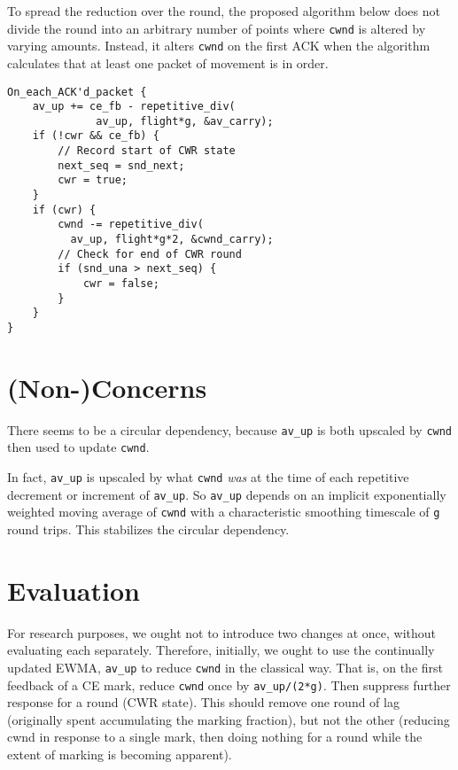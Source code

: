 To spread the reduction over the round, the proposed algorithm below does not divide the round into an arbitrary number of points where \texttt{cwnd} is altered by varying amounts. Instead, it alters \texttt{cwnd} on the first ACK when the algorithm calculates that at least one packet of movement is in order. 


\begin{verbatim}
On_each_ACK'd_packet {
    av_up += ce_fb - repetitive_div(
              av_up, flight*g, &av_carry);
    if (!cwr && ce_fb) {
        // Record start of CWR state
        next_seq = snd_next;
        cwr = true;
    }
    if (cwr) {
        cwnd -= repetitive_div(
          av_up, flight*g*2, &cwnd_carry);
        // Check for end of CWR round
        if (snd_una > next_seq) {
            cwr = false;
        }
    }
}
\end{verbatim}

\section{(Non-)Concerns}\label{prresp_Non-Concerns}

There seems to be a circular dependency, because \texttt{av\_up} is both upscaled by \texttt{cwnd} then used to update \texttt{cwnd}.

In fact, \texttt{av\_up} is upscaled by what \texttt{cwnd} \emph{was} at the time of each repetitive decrement or increment of \texttt{av\_up}. So  \texttt{av\_up} depends on an implicit exponentially weighted moving average of \texttt{cwnd} with a characteristic smoothing timescale of \texttt{g} round trips. This stabilizes the circular dependency.

\section{Evaluation}\label{prresp_Evaluation}

For research purposes, we ought not to introduce two changes at once, without evaluating each separately. Therefore, initially, we ought to use the continually updated EWMA, \texttt{av\_up} to reduce \texttt{cwnd} in the classical way. That is, on the first feedback of a CE mark, reduce \texttt{cwnd} once by \texttt{av\_up/(2*g)}. Then suppress further response for a round (CWR state). This should remove one round of lag (originally spent accumulating the marking fraction), but not the other (reducing cwnd in response to a single mark, then doing nothing for a round while the extent of marking is becoming apparent).


